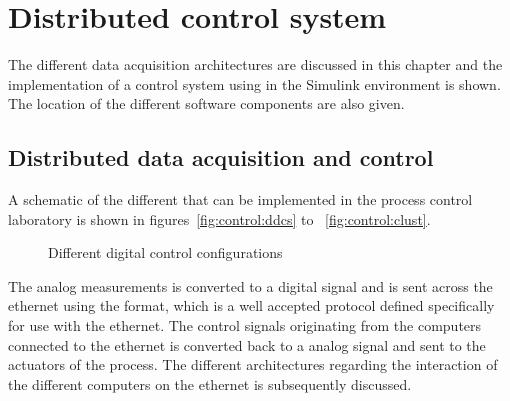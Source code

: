 \chapter{Distributed control system}
\begin{overview}
The different data acquisition architectures are discussed in this chapter and the implementation of a control system using in the Simulink environment is shown. The location of the different software components are also given. 
\end{overview}

\section{Distributed data acquisition and control}
A schematic of the different  that can be implemented in the process control laboratory is shown in figures~\ref{fig:control:ddcs} to ~\ref{fig:control:clust}. 
\begin{figure}[htbp]
  \centering
 	\caption{Different digital control configurations}
\end{figure}

The analog measurements is converted to a digital signal and is sent across the ethernet using the  format, which is a well accepted protocol defined specifically for use with the ethernet. The control signals originating from the computers connected to the ethernet is converted back to a analog signal and sent to the actuators of the process. The different architectures regarding the interaction of the different computers on the ethernet is subsequently discussed.

